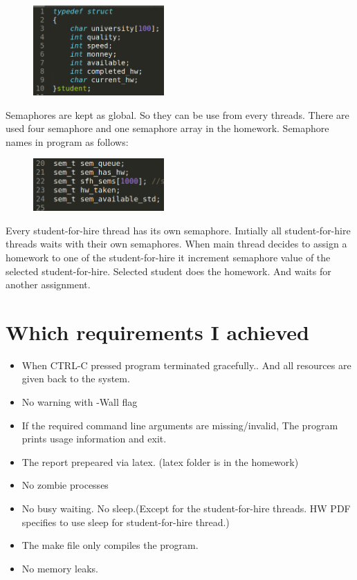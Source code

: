\documentclass[10pt,english, openany]{book}
\begin{document}
\begin{figure}[htp]
    \centering
    \includegraphics[width=5cm]{struct.PNG}
    
\end{figure}	 

Semaphores are kept as global. So they can be use from every threads. There are used four semaphore and one semaphore array in the homework. Semaphore names in program as follows:

\begin{figure}[htp]
    \centering
    \includegraphics[width=5cm]{sems.PNG}
    
\end{figure}

Every student-for-hire thread has its own semaphore. Inıtially all student-for-hire threads waits with their own semaphores. When main thread decides to assign a homework to one of the student-for-hire it increment semaphore value of the selected student-for-hire. Selected student does the homework. And waits for another assignment.

\section{Which requirements I achieved}

\begin{itemize}
  \item When CTRL-C pressed program terminated gracefully.. And all resources are given back to the system.
  \item No warning with -Wall flag
  \item If the required command line arguments are missing/invalid, The program prints usage information and exit.
  \item The report prepeared via latex. (latex folder is in the homework)
  \item No zombie processes
  \item No busy waiting. No sleep.(Except for the student-for-hire threads. HW PDF specifies to use sleep for student-for-hire thread.)
  \item The make file only compiles the program.
  \item No memory leaks.
\end{itemize}
\end{document}
